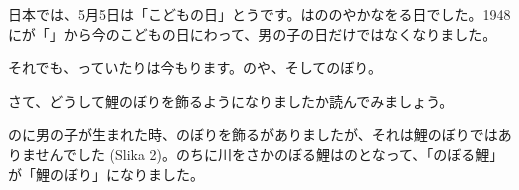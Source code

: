 
\author{autor}

	
	\begin{bunshou}
		\hspace{15pt}日本では、5月5日は「こどもの日」とう\hspace{5pt}です。は\hspace{10pt}ののやかなを\hspace{10pt}る日でした。\hspace{5pt}1948にが「」から今のこどもの日にわって、男の子の日だけではなくなりました。
		
		それでも、\hspace{10pt}っていたりは今もります。\hspace{5pt}の\hspace{10pt}や\hspace{10pt}、そしてのぼり。
	\end{bunshou}

	\fukudai{teži dio}
	\begin{bunshou}
		さて、どうして鯉のぼりを飾るようになりましたか読んでみましょう。
		
		のに男の子が生まれた時、のぼりを飾るがありましたが、それは鯉のぼりではありませんでした (Slika 2)。のちに川をさかのぼる鯉はの\hspace{10pt}となって、「のぼる鯉」が「鯉のぼり」になりました。
	\end{bunshou}

